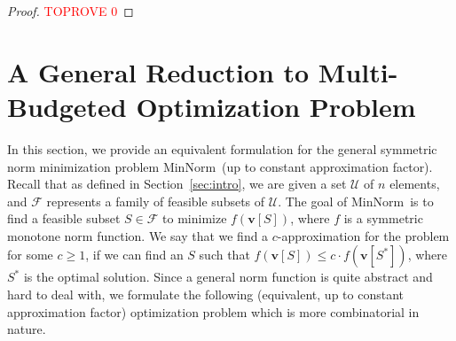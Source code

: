 \documentclass[11pt,a4paper]{article} \usepackage{enumitem}
\newcommand{\calF}{\mathcal{F}}
\newcommand{\calU}{\mathcal{U}}
\newcommand{\boldv}{\boldsymbol{v}}
\newcommand{\minnorm}{\textsf{MinNorm}}
\theoremstyle{definition}
\begin{document}
\begin{proof}\textcolor{red}{TOPROVE 0}\end{proof}









 



\section{A General Reduction to Multi-Budgeted Optimization Problem}
\label{sec:reduction}

In this section, we provide an equivalent formulation for the general symmetric norm minimization problem \minnorm\ (up to constant approximation factor). Recall that as defined in Section~\ref{sec:intro}, 
we are given a set $\calU$ of $n$ elements, and 
$\calF$ represents a family of feasible subsets of $\calU$.
The goal of \minnorm\ is to find a feasible subset $S\in\calF$ to minimize $f(\boldv[S])$,
where $f$ is a symmetric monotone norm function. 
We say that we find a $c$-approximation for the problem for some $c\geq 1$,
if we can find an $S$ such that $f(\boldv[S])\leq c\cdot f(\boldv[S^*])$, where $S^*$ is the optimal solution. 
Since a general norm function is quite abstract and hard to deal with,
we formulate the following (equivalent, up to constant approximation factor) optimization problem which is more combinatorial in nature. 
\end{document}
